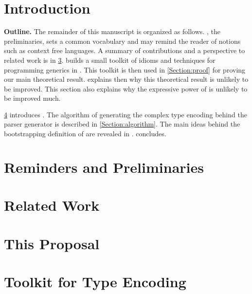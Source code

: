 \documentclass[a4paper,USenglish]{lipics}
\author{Anonymized for the submission}
\begin{document}
\maketitle
\begin{abstract}
	 
\end{abstract}

\section{Introduction}


\textbf{Outline.} 
The remainder of this manuscript is organized as follows.
, the preliminaries, sets a common vocabulary and may remind
  the reader of notions such as context free languages.  
A summary of contributions and a perspective to related work is  
  in \cref{Section:related}.
 builds a small toolkit of idioms and techniques 
  for programming generics in \Java.  
This toolkit is then used in \cref{Section:proof} for
  proving our main theoretical result.
 explains then why 
  this theoretical result is unlikely to be improved.
This section also explains why the expressive power of \Self 
  is unlikely to be improved much. 

\cref{Section:proposal} introduces \Self.
The algorithm of generating the complex type encoding behind the parser generator 
  is described in \cref{Section:algorithm}. 
The main ideas behind the bootstrapping definition of \Self 
  are revealed in . 
 concludes. 

\section{Reminders and Preliminaries}
\label{Section:preliminaries}


\section{Related Work}
\label{Section:related}


\section{This Proposal}
\label{Section:proposal}
%

\section{Toolkit for Type Encoding}
\label{Section:toolkit}

\end{document}
